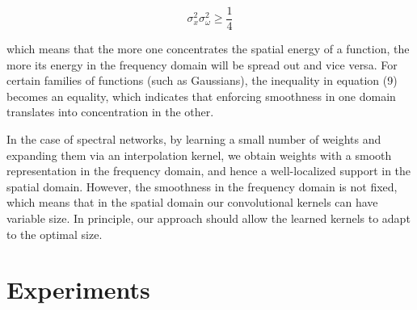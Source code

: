 \documentclass{article}
\begin{document}
\begin{equation}
 \sigma_{x}^2 \sigma_{\omega}^2 \geq \frac{1}{4}
\end{equation}

which means that the more one concentrates the spatial energy of a function, the more its energy in the frequency domain will be spread out and vice versa.
For certain families of functions (such as Gaussians), the inequality in equation (9) becomes an equality, which indicates that enforcing smoothness in one domain translates into concentration in the other. 

In the case of spectral networks, by learning a small number of weights and expanding them via an interpolation kernel, we obtain weights with a smooth representation in the frequency domain, and hence a well-localized support in the spatial domain. However, the smoothness in the frequency domain is not fixed, which means that in the spatial domain our convolutional kernels can have variable size. In principle, our approach should allow the learned kernels to adapt to the optimal size. 








\section{Experiments}





\end{document}
